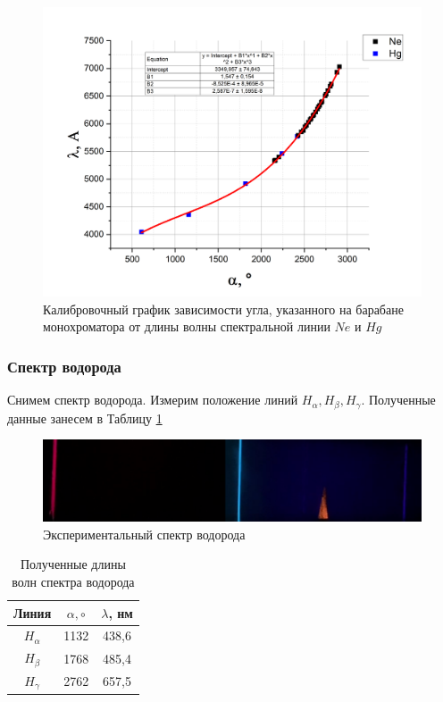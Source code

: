 \documentclass[a4paper,12pt]{article}
\begin{document}
\begin{figure}[h!]
	\centering
	\includegraphics[width=\linewidth]{Calibration (3 degree polynom)}
	\caption{Калибровочный график зависимости угла, указанного на барабане монохроматора от длины волны спектральной линии $Ne$ и $Hg$}
\end{figure}

\subsubsection*{Спектр водорода}

Снимем спектр водорода. Измерим положение линий $H_{\alpha}, H_{\beta}, H_{\gamma}$. Полученные данные занесем в Таблицу \ref{table1:hydrogen}

\begin{figure}[h!]
	\centering
	\includegraphics[width=\linewidth]{Hydrogen_spectre_2}
	\caption{Экспериментальный спектр водорода}
\end{figure}	

\begin{table}[h!]
	\centering
	\caption{Полученные длины волн спектра водорода}
	\label{table1:hydrogen}
	\begin{tabular}{|c|c|c|}
	\hline
	Линия & $\alpha, \circ$ & $\lambda$, нм \\ \hline
	$H_{\alpha}$ & 1132 & 438,6 \\ \hline
	$H_{\beta}$ & 1768 & 485,4 \\ \hline
	$H_{\gamma}$ & 2762 & 657,5 \\ \hline
	\end{tabular}
\end{table}
\end{document}
